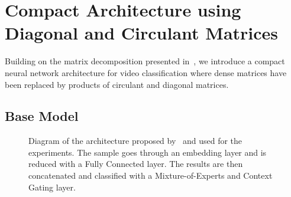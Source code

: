 \section{Compact Architecture using Diagonal and Circulant Matrices}
\label{section:ap2-compact_video_classification_architecture_using_diagonal_and_circulant_matrices}

Building on the matrix decomposition presented in~, we introduce a compact neural network architecture for video classification where dense matrices have been replaced by products of circulant and diagonal matrices.

\subsection{Base Model}
\label{subsection:ap2-base_model}

\begin{figure}[ht]
  \centering
  
  \caption{Diagram of the architecture proposed by~\citet{miech2017learnable} and used for the experiments. The sample goes through an embedding layer and is reduced with a Fully Connected layer. The results are then concatenated and classified with a Mixture-of-Experts and Context Gating layer.}
  \label{figure:ap2-model_baseline}
\end{figure}

